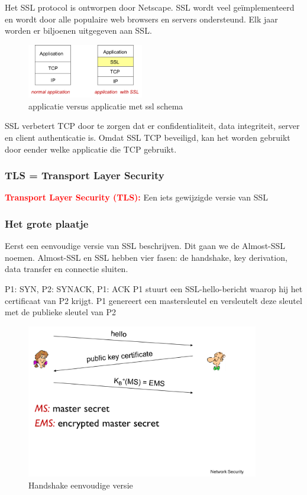 \noindent Het SSL protocol is ontworpen door Netscape. SSL wordt veel geïmplementeerd en wordt door alle populaire web browsers en servers ondersteund. Elk jaar worden er biljoenen uitgegeven aan SSL.

\begin{figure}[h]
    \centering
    \includegraphics[width=2in]{./img/imghfdst8/hfdst8puntje27.png}
    \caption{applicatie versus applicatie met ssl schema }      
    \label{fig:applicatie versus applicatie met ssl schema }
\end{figure}

\noindent SSL verbetert TCP door te zorgen dat er confidentialiteit, data integriteit, server en client authenticatie is. Omdat SSL TCP beveiligd, kan het worden gebruikt door eender welke applicatie die TCP gebruikt.

\subsubsection{TLS = Transport Layer Security}

\textcolor{red}{\textbf{Transport Layer Security (TLS):}} Een iets gewijzigde versie van SSL

\clearpage

\subsubsection{Het grote plaatje}

\noindent Eerst een eenvoudige versie van SSL beschrijven. Dit gaan we de Almost-SSL noemen. Almost-SSL en SSL hebben vier fasen: de handshake, key derivation, data transfer en connectie sluiten.


\be
\itf P1: SYN, P2: SYNACK, P1: ACK
\itf P1 stuurt een SSL-hello-bericht waarop hij het certificaat van P2 krijgt.
\itf P1 genereert een mastersleutel en versleutelt deze sleutel met de publieke sleutel van P2
\ee

\begin{figure}[h]
    \centering
    \includegraphics[width=4in]{./img/imghfdst8/hfdst8puntje28.png}
    \caption{Handshake eenvoudige versie }      
    \label{fig:Handshake eenvoudige versie}
\end{figure}

